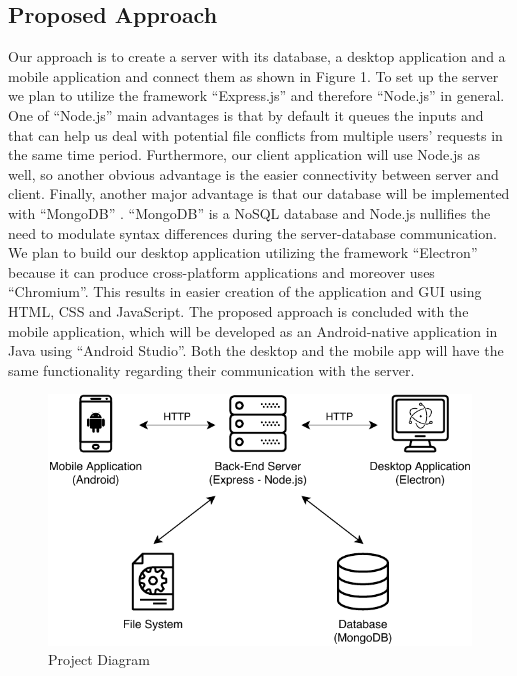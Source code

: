 \documentclass[11pt]{article}
\begin{document}
\subsection{Proposed Approach}
Our approach is to create a server with its database, a desktop application and a mobile application and connect them as shown in Figure 1. 
To set up the server we plan to utilize the framework “Express.js” \cite{author-1:18} and therefore “Node.js” \cite{author-2:18} in general. One of “Node.js” main advantages is that by default it queues the inputs \cite{author-3:18} and that can help us deal with potential file conflicts from multiple users’ requests in the same time period. Furthermore, our client application will use Node.js as well, so another obvious advantage is the easier connectivity between server and client. Finally, another major advantage is that our database will be implemented with “MongoDB” \cite{author-4:18}. “MongoDB” is a NoSQL database and Node.js nullifies the need to modulate syntax differences during the server-database communication. We plan to build our desktop application utilizing the framework “Electron” \cite{author-5:18} because it can produce cross-platform applications and moreover uses “Chromium”. This results in easier creation of the application and GUI using HTML, CSS and JavaScript. The proposed approach is concluded with the mobile application, which will be developed as an Android-native application in Java using “Android Studio”. Both the desktop and the mobile app will have the same functionality regarding their communication with the server.

\begin{figure}[h]
	\centering
	\includegraphics[scale=1.0]{graphics/ProjectDiagram.pdf}
	\caption{Project Diagram}
\end{figure}
\end{document}
